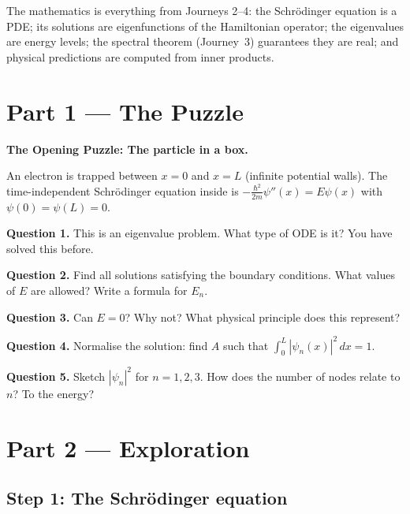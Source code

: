 \documentclass[12pt,a4paper]{article}
\newcounter{problem}
\begin{document}
\medskip
The mathematics is everything from Journeys 2--4: the Schr\"{o}dinger equation is a PDE; its solutions are eigenfunctions of the Hamiltonian operator; the eigenvalues are energy levels; the spectral theorem (Journey~3) guarantees they are real; and physical predictions are computed from inner products.

\newpage

\section{Part 1 \texorpdfstring{---}{--} The Puzzle}

\begin{puzzlebox}
\textbf{The Opening Puzzle: The particle in a box.}

An electron is trapped between $x=0$ and $x=L$ (infinite potential walls). The time-independent Schr\"{o}dinger equation inside is $-\frac{\hbar^2}{2m}\psi''(x) = E\psi(x)$ with $\psi(0)=\psi(L)=0$.

\medskip
\textbf{Question 1.} This is an eigenvalue problem. What type of ODE is it? You have solved this before.

\textbf{Question 2.} Find all solutions satisfying the boundary conditions. What values of $E$ are allowed? Write a formula for $E_n$.

\textbf{Question 3.} Can $E=0$? Why not? What physical principle does this represent?

\textbf{Question 4.} Normalise the solution: find $A$ such that $\int_0^L|\psi_n(x)|^2\,dx=1$.

\textbf{Question 5.} Sketch $|\psi_n|^2$ for $n=1,2,3$. How does the number of nodes relate to $n$? To the energy?
\end{puzzlebox}

\section{Part 2 \texorpdfstring{---}{--} Exploration}

\subsection{Step 1: The Schr\"{o}dinger equation}
\end{document}
